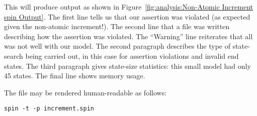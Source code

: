 This will produce output as shown in
Figure~\ref{fig:analysis:Non-Atomic Increment spin Output}.
The first line tells us that our assertion was violated (as expected
given the non-atomic increment!).
The second line that a  file was written describing how the
assertion was violated.
The ``Warning'' line reiterates that all was not well with our model.
The second paragraph describes the type of state-search being carried out,
in this case for assertion violations and invalid end states.
The third paragraph gives state-size statistics: this small model had only
45 states.
The final line shows memory usage.

The  file may be rendered human-readable as follows:

\vspace{5pt}
\begin{minipage}[t]{\columnwidth}
\scriptsize
\begin{verbatim}
spin -t -p increment.spin
\end{verbatim}
\end{minipage}
\vspace{5pt}

